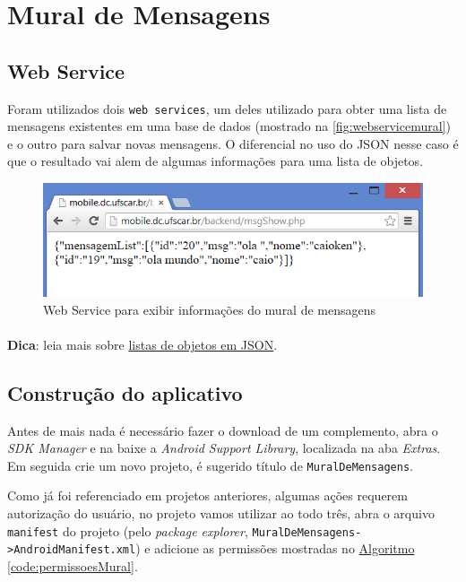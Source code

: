 \documentclass[a4paper,12pt,brazil,oneside]{book}
\begin{document}

\section{Mural de Mensagens}

\subsection{Web Service}

Foram utilizados dois \texttt{web services}, um deles utilizado para obter uma lista de mensagens existentes em uma base de dados (mostrado na \autoref{fig:webservicemural}) e o outro para salvar novas mensagens.
O diferencial no uso do JSON nesse caso é que o resultado vai alem de algumas informações para uma lista de objetos.

\begin{figure}[H]
  \centering
  \includegraphics[width=.75\textwidth]{figuras/devapp/muraldemensagens/webService.png}
  \caption{Web Service para exibir informações do mural de mensagens}
  \label{fig:webservicemural}
\end{figure}

\begin{framed}
\paragraph{}\textbf{Dica}: leia mais sobre \href{http://devmedia.com.br/introducao-ao-formato-json/25275}{listas de objetos em JSON}.
\end{framed}

\subsection{Construção do aplicativo}

Antes de mais nada é necessário fazer o download de um complemento, abra o \emph{SDK Manager} e na baixe a \emph{Android Support Library}, localizada na aba \emph{Extras}. Em seguida crie um novo projeto, é sugerido título de \texttt{MuralDeMensagens}.

Como já foi referenciado em projetos anteriores, algumas ações requerem autorização do usuário, no projeto vamos utilizar ao todo três, abra o arquivo \texttt{manifest} do projeto (pelo \emph{package explorer}, \texttt{MuralDeMensagens->AndroidManifest.xml}) e adicione as permissões mostradas no \hyperref[code:permissoesMural]{Algoritmo \ref*{code:permissoesMural}}.
\end{document}
